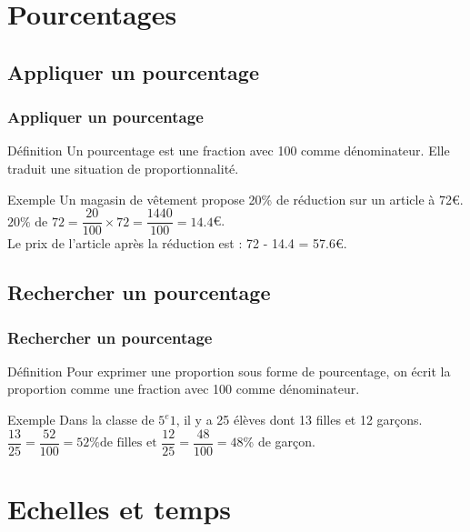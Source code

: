 \documentclass{beamer}
\begin{document}
\section{Pourcentages}
\subsection{Appliquer un pourcentage}

\begin{frame}
  \frametitle{Appliquer un pourcentage}
  \begin{alertblock}{Définition}	
    Un pourcentage est une fraction avec 100 comme dénominateur. Elle traduit une situation de proportionnalité.
  \end{alertblock}

  \begin{block}{Exemple}
     Un magasin de vêtement propose 20\% de réduction sur un article à 72\euro.\\
  $20\% \text{ de } 72 = \dfrac{20}{100} \times 72 = \dfrac{1440}{100} = 14.4$\euro.\\
  Le prix de l'article après la réduction est : 72 - 14.4 = 57.6\euro.
  \end{block}   
\end{frame}

  \subsection{Rechercher un pourcentage}

\begin{frame}
  \frametitle{Rechercher un pourcentage}
  \begin{alertblock}{Définition}	
    Pour exprimer une proportion sous forme de pourcentage, on écrit la proportion comme une fraction avec 100 comme dénominateur.
  \end{alertblock}

  \begin{block}{Exemple}
     Dans la classe de $5^{e}1$, il y a 25 élèves dont 13 filles et 12 garçons.\\
  $\dfrac{13}{25} = \dfrac{52}{100} = 52 \text{\% de filles et } \dfrac{12}{25} = \dfrac{48}{100} = 48$\% de garçon.
  \end{block}   
\end{frame}

\section{Echelles et temps}
\end{document}
